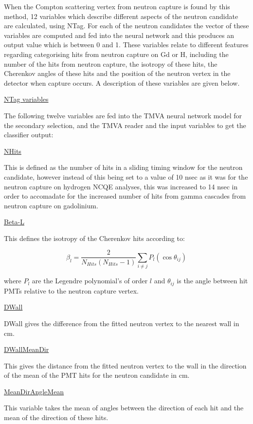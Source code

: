 When the Compton scattering vertex from neutron capture is found by this method, 12 variables which describe different aspects of the neutron candidate are calculated, using NTag. For each of the neutron candidates the vector of these variables are computed and fed into the neural network and this produces an output value which is between 0 and 1. These variables relate to different features regarding categorising hits from neutron capture on Gd or H, including the number of the hits from neutron capture, the isotropy of these hits, the Cherenkov angles of these hits and the position of the neutron vertex in the detector when capture occurs. A description of these variables are given below.


\underline{NTag variables}

The following twelve variables are fed into the TMVA neural network model for the secondary selection, and the TMVA reader and the input variables to get the classifier output:

\underline{NHits}

This is defined as the number of hits in a sliding timing window for the neutron candidate, however instead of this being set to a value of 10 nsec as it was for the neutron capture on hydrogen NCQE analyses, this was increased to 14 nsec in order to accomadate for the increased number of hits from gamma cascades from neutron capture on gadolinium.

\underline{Beta-L}

This defines the isotropy of the Cherenkov hits according to:

\begin{equation}
    \beta_l=\frac{2}{N_{H i t s}\left(N_{H i t s}-1\right)} \sum_{i \neq j} P_l\left(\cos \theta_{i j}\right)
\end{equation}

where $P_{l}$ are the Legendre polynomial's of order $l$ and $\theta_{ij}$ is the angle between hit PMTs relative to the neutron capture vertex.

\underline{DWall}

DWall gives the difference from the fitted neutron vertex to the nearest wall in cm.

\underline{DWallMeanDir}

This gives the distance from the fitted neutron vertex to the wall in the direction of the mean of the PMT hits for the neutron candidate in cm.

\underline{MeanDirAngleMean}

This variable takes the mean of angles between the direction of each hit and the mean of the direction of these hits. 


